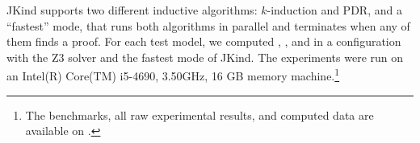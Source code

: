 JKind supports two different inductive algorithms: $k$-induction and PDR, and a ``fastest'' mode, that runs both algorithms in parallel and terminates when any of them finds a proof. For each test model, we computed \ucalg, \ucbfalg, and \mustalg in a configuration with
the Z3 solver and the fastest mode of JKind. The experiments
were run on an  Intel(R) Core(TM) i5-4690, 3.50GHz,
16 GB memory machine.\footnote{The benchmarks, all raw experimental results,
  and computed data are available on \cite{expr}.}

